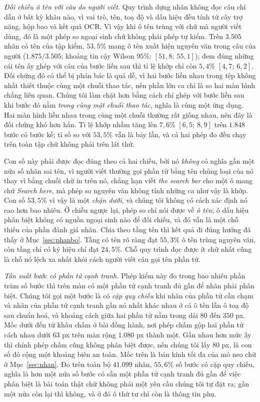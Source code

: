 \documentclass[12pt,a4paper,onecolumn]{article}
\newcommand{\ôvuông}[2]{\tikz[baseline=-0.45ex]{\draw[#1,line width=0.9pt,#2] (0,0) rectangle (0.34,0.18);}}
\begin{document}
\emph{Đối chiếu ô tên với câu do người viết.} Quy trình dựng nhãn không đọc câu chỉ dẫn ở bất kỳ khâu nào, vì vai trò, tên, toạ độ và
dấu hiệu đều tính từ cây trợ năng, hộp bao và kết quả OCR. Vì vậy khi ô tên trùng với chữ mà người viết dùng, đó là một phép so ngoại sinh chứ không
phải phép tự kiểm. Trên $3.505$ nhãn có tên của tập kiểm, $53{,}5\%$ mang ô tên xuất
hiện nguyên văn trong câu của người ($1.875/3.505$; khoảng tin cậy Wilson $95\%$:
$[51{,}8;\ 55{,}1]$); đem đúng những cái tên ấy ghép với câu của bước liền sau thì tỉ lệ
khớp chỉ còn $5{,}4\%$ $[4{,}7;\ 6{,}2]$. Đối chứng đó có thể bị phản bác là quá dễ, vì hai bước liền nhau trong tệp không nhất
thiết thuộc cùng một chuỗi thao tác, nên phần lớn ca chỉ là so hai màn hình chẳng liên
quan.
Chúng tôi làm chặt hơn bằng cách chỉ ghép với bước liền sau khi bước đó nằm \emph{trong cùng một chuỗi thao tác}, nghĩa là cùng một ứng dụng. Hai màn hình liền nhau trong cùng một
chuỗi thường rất giống nhau, nên đây là đối chứng khó hơn hẳn. Tỉ lệ khớp nhầm
tăng lên $7{,}6\%$ $[6{,}5;\ 8{,}9]$ trên $1.848$ bước có bước kế; tỉ số so với $53{,}5\%$
vẫn là bảy lần, và cả hai phép đo đều chạy trên toàn tập chứ không phải trên lát thử.

Con số này phải được đọc đúng theo cả hai chiều, bởi nó \emph{không} có nghĩa gần một nửa
số nhãn sai tên, vì người viết thường gọi phần tử bằng tên chủng loại của nó thay vì bằng
chuỗi chữ in trên nó, chẳng hạn viết \emph{the search bar} cho một ô mang chữ \emph{Search
here}, mà phép so nguyên văn không tính những ca như vậy là khớp. Con số $53{,}5\%$ vì vậy là
một \emph{chặn dưới}, và chúng tôi không có cách xác định nó cao hơn bao nhiêu. Ở chiều ngược
lại, phép so chỉ nói được về \emph{ô tên}; ô dấu hiệu phân biệt không có nguồn ngoại sinh
nào để đối chiếu, và đó vẫn là một chỗ thiếu của phần đánh giá nhãn. Chia theo tầng tên thì
kết quả đi đúng hướng đã thấy ở Mục~\ref{sec:phanbo}. Tầng có tên rõ ràng đạt $55{,}3\%$
ô tên trùng nguyên văn, còn tầng chỉ có ký hiệu chỉ đạt $24{,}5\%$. Chỗ quy trình đọc được
ít chữ nhất cũng là chỗ nó lệch xa nhất khỏi cách người viết câu gọi tên phần tử.

\emph{Tần suất bước có phần tử cạnh tranh.} Phép kiểm này đo trong bao nhiêu phần
trăm số bước thì trên màn có một phần tử cạnh tranh đủ gần để nhãn phải phân biệt. Chúng tôi gọi một bước là có \emph{cặp quy chiếu} khi nhãn của phần tử cần chạm và nhãn của phần tử cạnh tranh gần nó nhất khác nhau ở cả ô tên lẫn ô toạ độ sau
chuẩn hoá, và khoảng cách giữa hai phần tử nằm trong dải $80$ đến $350$ px. Mốc dưới đến
từ khâu chấm ở bài đồng hành, nơi phép chấm gộp hai phần tử cách nhau dưới $63$ px trên màn rộng $1.080$ px thành một.
Gần nhau hơn mức ấy thì chính phép chấm cũng không phân biệt được, nên chúng tôi lấy $80$ px, là con số đó cộng một khoảng biên an toàn. Mốc trên là bán kính tối đa của mỏ neo chữ ở Mục~\ref{sec:nhan}. Đo trên toàn bộ $41.099$ nhãn, $55{,}6\%$ số bước có cặp quy chiếu, nghĩa là hơn một nửa số bước có sẵn một phần tử cạnh tranh đủ gần để việc
phân biệt là bài toán thật chứ không phải một yêu cầu chúng tôi tự đặt ra; gần một nửa còn
lại thì không, và ở đó ô thứ tư chỉ còn là thông tin phụ.
\end{document}
